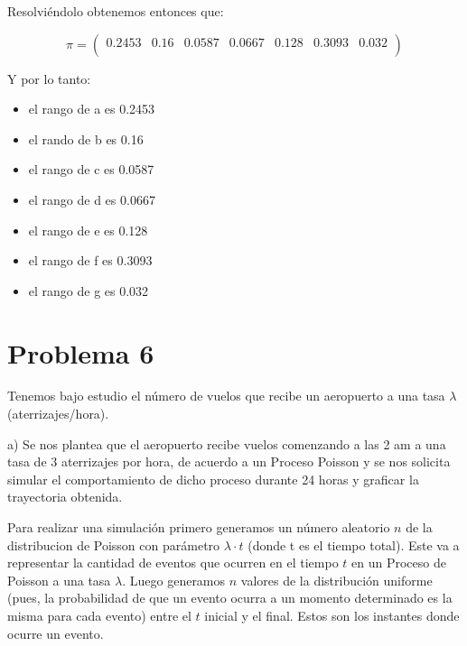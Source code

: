 \documentclass[11pt]{article}
\begin{document}
Resolviéndolo obtenemos entonces que: 

\vspace{-0.5cm}

\begin{equation*}
    \pi = \begin{pmatrix}
        0.2453 & 0.16 & 0.0587 & 0.0667 & 0.128 & 0.3093 & 0.032 \\
    \end{pmatrix}
\end{equation*}

Y por lo tanto: 

\vspace{-0.3cm}

\begin{itemize}
    \item el rango de a es 0.2453
    \item el rando de b es 0.16
    \item el rango de c es 0.0587
    \item el rango de d es 0.0667
    \item el rango de e es 0.128
    \item el rango de f es 0.3093
    \item el rango de g es 0.032
\end{itemize}

\section*{Problema 6}

Tenemos bajo estudio el número de vuelos que recibe un aeropuerto a una tasa
$\lambda$ (aterrizajes/hora).

a) Se nos plantea que el aeropuerto recibe vuelos comenzando a las 2 am a una tasa de 3 aterrizajes por hora, de
acuerdo a un Proceso Poisson y se nos solicita simular el comportamiento de dicho proceso durante 24 horas y
graficar la trayectoria obtenida.

Para realizar una simulación primero generamos un número aleatorio $n$ de la distribucion de Poisson con parámetro
$\lambda \cdot t$ (donde t es el tiempo total). Este va a representar la cantidad de eventos 
que ocurren en el tiempo $t$ en un Proceso de Poisson a una tasa $\lambda$. Luego generamos $n$ valores 
de la distribución uniforme (pues, la probabilidad de que un evento ocurra a un momento determinado
es la misma para cada evento) entre el $t$ inicial y el final. Estos son los instantes donde ocurre un evento.
\end{document}
